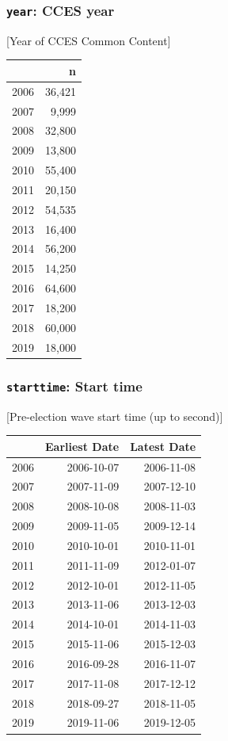 \documentclass[10pt,article,oneside]{memoir}
\theoremstyle{definition}
\begin{document}
\hypertarget{year-cces-year}{%
\subsubsection{\texorpdfstring{\texttt{year}: CCES
year}{year: CCES year}}\label{year-cces-year}}

{[}Year of CCES Common Content{]}

\begin{table}[H]
\centering
\begin{tabular}{lr}
\toprule
 & n\\
\midrule
2006 & 36,421\\
2007 & 9,999\\
2008 & 32,800\\
2009 & 13,800\\
2010 & 55,400\\
2011 & 20,150\\
2012 & 54,535\\
2013 & 16,400\\
2014 & 56,200\\
2015 & 14,250\\
2016 & 64,600\\
2017 & 18,200\\
2018 & 60,000\\
2019 & 18,000\\
\bottomrule
\end{tabular}
\end{table}

\hypertarget{starttime-start-time}{%
\subsubsection{\texorpdfstring{\texttt{starttime}: Start
time}{starttime: Start time}}\label{starttime-start-time}}

{[}Pre-election wave start time (up to second){]}

\begin{table}[H]
\centering
\begin{tabular}{lrr}
\toprule
 & Earliest Date & Latest Date\\
\midrule
2006 & 2006-10-07 & 2006-11-08\\
2007 & 2007-11-09 & 2007-12-10\\
2008 & 2008-10-08 & 2008-11-03\\
2009 & 2009-11-05 & 2009-12-14\\
2010 & 2010-10-01 & 2010-11-01\\
2011 & 2011-11-09 & 2012-01-07\\
2012 & 2012-10-01 & 2012-11-05\\
2013 & 2013-11-06 & 2013-12-03\\
2014 & 2014-10-01 & 2014-11-03\\
2015 & 2015-11-06 & 2015-12-03\\
2016 & 2016-09-28 & 2016-11-07\\
2017 & 2017-11-08 & 2017-12-12\\
2018 & 2018-09-27 & 2018-11-05\\
2019 & 2019-11-06 & 2019-12-05\\
\bottomrule
\end{tabular}
\end{table}
\end{document}
